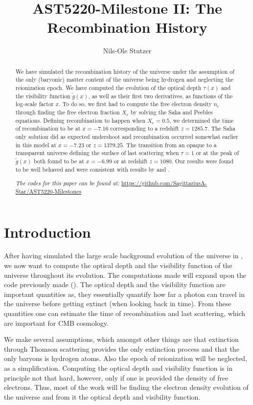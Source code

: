 \documentclass[twocolumn]{aastex62}
\begin{document}
\title{\Large AST5220-Milestone II: The Recombination History}

\author{Nils-Ole Stutzer}

\begin{abstract}
    We have simulated the recombination history of the universe under the assumption of the only (baryonic) matter content of the universe being hydrogen and neglecting  the reionization epoch. We have computed the evolution of the optical depth $\tau(x)$ and the visibility function $\tilde{g}(x)$, as well as their first two derivatives, as functions of the log-scale factor $x$. To do so, we first had to compute the free electron density $n_e$ through finding the free electron fraction $X_e$ by solving the Saha and Peebles equations. Defining recombination to happen when $X_e = 0.5$, we determined the time of recombination to be at $x = -7.16$ corresponding to a redshift $z = 1285.7$. The Saha only solution did as expected undershoot and recombination occurred somewhat earlier in this model at $x = -7.23$ or $z = 1379.25$. The transition from an opaque to a transparent universe defining the surface of last scattering when $\tau = 1$ or at the peak of $\tilde{g}(x)$ both found to be at $x = -6.99$ or at redshift $z = 1080$. Our results were found to be well behaved and were consistent with results by \cite{callin:2006} and \cite{winther:2020}.

    \textit{The codes for this paper can be found at:} \newline \url{https://github.com/SagittariusA-Star/AST5220-Milestones}
\end{abstract}

\section{Introduction} \label{sec:Intro}
After having simulated the large scale background evolution of the universe in \cite{stutzer:2020}, we now want to compute the optical depth and the visibility function of the universe throughout its evolution. 
The computations made will expand upon the code previously made (\cite{stutzer:2020}). The optical depth and the visibility function are important quantities as, they essentially quantify how far a photon can travel in the universe before getting extinct (when looking back in time). From these quantities one can estimate the time of recombination and last scattering, which are important for CMB cosmology. 

We make several assumptions, which amongst other things are that extinction through Thomson scattering provides the only extinction process and that the only baryons is hydrogen atoms. Also the epoch of reionization will be neglected, as a simplification. Computing the optical depth and visibility function is in principle not that hard, however, only if one is provided the density of free electrons. Thus, most of the work will be finding the electron density evolution of the universe and from it the optical depth and visibility function. 
\end{document}

